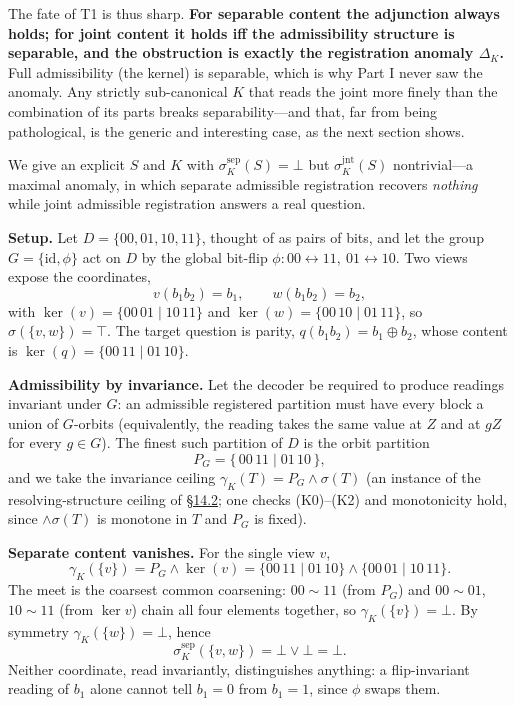 The fate of T1 is thus sharp. \textbf{For separable content the adjunction always holds; for joint content it holds iff the admissibility structure is separable, and the obstruction is exactly the registration anomaly \(\Delta_K\).} Full admissibility (the kernel) is separable, which is why Part I never saw the anomaly. Any strictly sub-canonical \(K\) that reads the joint more finely than the combination of its parts breaks separability---\hspace{0pt}and that, far from being pathological, is the generic and interesting case, as the next section shows.



We give an explicit \(S\) and \(K\) with \(\sigma^{\mathrm{sep}}_K(S)=\bot\) but \(\sigma^{\mathrm{jnt}}_K(S)\) nontrivial---\hspace{0pt}a maximal anomaly, in which separate admissible registration recovers \emph{nothing} while joint admissible registration answers a real question.

\textbf{Setup.} Let \(D=\{00,01,10,11\}\), thought of as pairs of bits, and let the group \(G=\{\mathrm{id},\phi\}\) act on \(D\) by the global bit-flip \(\phi:00\leftrightarrow11,\ 01\leftrightarrow10\). Two views expose the coordinates,
\[
v(b_1b_2)=b_1,\qquad w(b_1b_2)=b_2,
\]
with \(\ker(v)=\{00\,01\mid10\,11\}\) and \(\ker(w)=\{00\,10\mid01\,11\}\), so \(\sigma(\{v,w\})=\top\). The target question is parity, \(q(b_1b_2)=b_1\oplus b_2\), whose content is \(\ker(q)=\{00\,11\mid01\,10\}\).

\textbf{Admissibility by invariance.} Let the decoder be required to produce readings invariant under \(G\): an admissible registered partition must have every block a union of \(G\)-orbits (equivalently, the reading takes the same value at \(Z\) and at \(gZ\) for every \(g\in G\)). The finest such partition of \(D\) is the orbit partition
\[
P_G=\{\,00\,11\mid01\,10\,\},
\]
and we take the invariance ceiling \(\gamma_K(T)=P_G\wedge\sigma(T)\) (an instance of the resolving-structure ceiling of \hyperlink{sec:14.2}{§14.2}; one checks (K0)--(K2) and monotonicity hold, since \(\wedge\sigma(T)\) is monotone in \(T\) and \(P_G\) is fixed).

\textbf{Separate content vanishes.} For the single view \(v\),
\[
\gamma_K(\{v\})=P_G\wedge\ker(v)=\{00\,11\mid01\,10\}\wedge\{00\,01\mid10\,11\}.
\]
The meet is the coarsest common coarsening: \(00\sim11\) (from \(P_G\)) and \(00\sim01\), \(10\sim11\) (from \(\ker v\)) chain all four elements together, so \(\gamma_K(\{v\})=\bot\). By symmetry \(\gamma_K(\{w\})=\bot\), hence
\[
\sigma^{\mathrm{sep}}_K(\{v,w\})=\bot\vee\bot=\bot.
\]
Neither coordinate, read invariantly, distinguishes anything: a flip-invariant reading of \(b_1\) alone cannot tell \(b_1=0\) from \(b_1=1\), since \(\phi\) swaps them.


